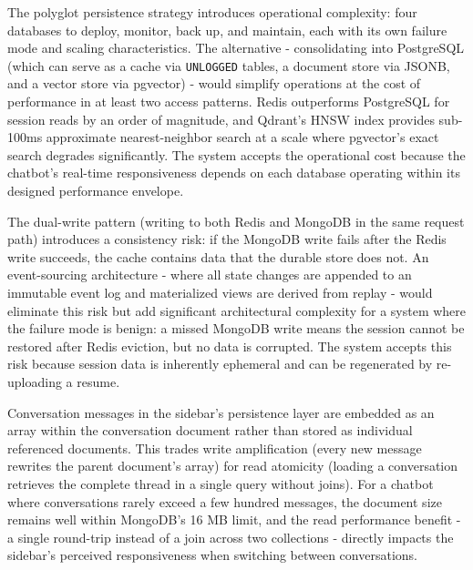 \documentclass[12pt, a4paper]{report}
\begin{document}
\vspace{0.3cm}

The polyglot persistence strategy introduces operational complexity: four databases to deploy, monitor, back up, and maintain, each with its own failure mode and scaling characteristics. The alternative - consolidating into PostgreSQL (which can serve as a cache via \texttt{UNLOGGED} tables, a document store via JSONB, and a vector store via pgvector) - would simplify operations at the cost of performance in at least two access patterns. Redis outperforms PostgreSQL for session reads by an order of magnitude, and Qdrant's HNSW index provides sub-100ms approximate nearest-neighbor search at a scale where pgvector's exact search degrades significantly. The system accepts the operational cost because the chatbot's real-time responsiveness depends on each database operating within its designed performance envelope.

\vspace{0.3cm}

The dual-write pattern (writing to both Redis and MongoDB in the same request path) introduces a consistency risk: if the MongoDB write fails after the Redis write succeeds, the cache contains data that the durable store does not. An event-sourcing architecture - where all state changes are appended to an immutable event log and materialized views are derived from replay - would eliminate this risk but add significant architectural complexity for a system where the failure mode is benign: a missed MongoDB write means the session cannot be restored after Redis eviction, but no data is corrupted. The system accepts this risk because session data is inherently ephemeral and can be regenerated by re-uploading a resume.

\vspace{0.3cm}

Conversation messages in the sidebar's persistence layer are embedded as an array within the conversation document rather than stored as individual referenced documents. This trades write amplification (every new message rewrites the parent document's array) for read atomicity (loading a conversation retrieves the complete thread in a single query without joins). For a chatbot where conversations rarely exceed a few hundred messages, the document size remains well within MongoDB's 16 MB limit, and the read performance benefit - a single round-trip instead of a join across two collections - directly impacts the sidebar's perceived responsiveness when switching between conversations.
\end{document}
